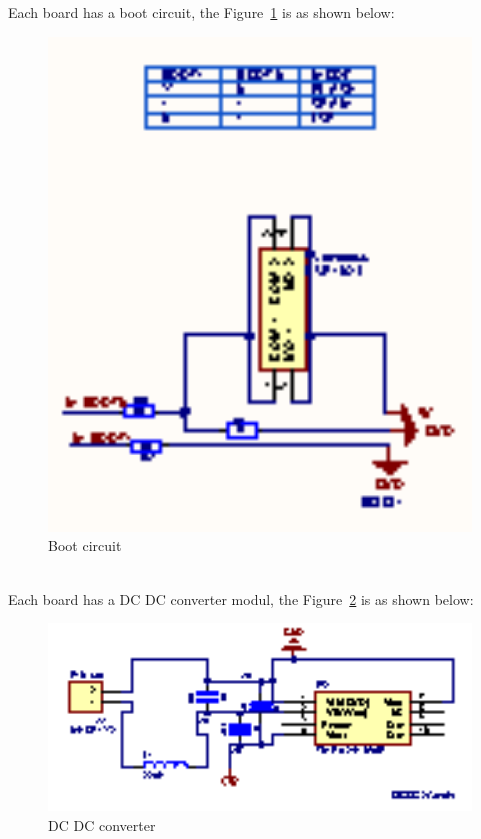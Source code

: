 Each board has a boot circuit, the Figure~\ref{fig:6.6} is as shown below:
\begin{figure}[!ht]
	\centering
	\includegraphics[width=16cm]{grafiken/boot_master.eps}
	\caption{Boot circuit} 
	\label{fig:6.6}
\end{figure}
\FloatBarrier
\\

Each board has a DC DC converter modul, the Figure~\ref{fig:6.7} is as shown below:
\begin{figure}[!ht]
	\centering
	\includegraphics[width=16cm]{grafiken/dcdc.eps}
	\caption{DC DC converter} 
	\label{fig:6.7}
\end{figure}
\FloatBarrier
\\

